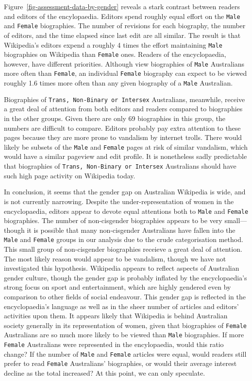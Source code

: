 \documentclass[
  a4paper,
  DIV=11,
  numbers=noendperiod]{scrreprt}
\begin{document}
Figure~\ref{fig-assessment-data-by-gender} reveals a stark contrast
between readers and editors of the encylopaedia. Editors spend roughly
equal effort on the \texttt{Male} and \texttt{Female} biographies. The
number of revisions for each biography, the number of editors, and the
time elapsed since last edit are all similar. The result is that
Wikipedia's editors expend a roughly 4 times the effort maintaining
\texttt{Male} biographies on Wikipedia than \texttt{Female} ones.
Readers of the encyclopaedia, however, have different priorities.
Although view biographies of \texttt{Male} Australians more often than
\texttt{Female}, an individual \texttt{Female} biography can expect to
be viewed roughly 1.6 times more often than any given biography of a
\texttt{Male} Australian.

Biographies of \texttt{Trans,\ Non-Binary\ or\ Intersex} Australians,
meanwhile, receive a great deal of attention from both editors and
readers compared to biographies in the other groups. Given there are
only 69 biographies in this group, the numbers are difficult to compare.
Editors probably pay extra attention to these pages because they are
more prone to vandalism by internet trolls. There would likely be
subsets of the \texttt{Male} and \texttt{Female} pages at risk of
similar vandalism, which would have a similar pageview and edit profile.
It is nonetheless sadly predictable that biographies of
\texttt{Trans,\ Non-Binary\ or\ Intersex} Australians should have such
high page activity on Wikipedia today.

In conclusion, it seems that the gender gap on Australian Wikipedia is
wide, and is not currently narrowing. Despite the under-representation
of women in the encyclopaedia, editors appear to devote equal attentions
both to \texttt{Male} and \texttt{Female} biographies. The number of
non-cisgender biographies appears to be very small---though it is
possible that many non-cisgender Australians have fallen into the
\texttt{Male} and \texttt{Female} groups in our analysis due to the
crude categorisation method. This small group of non-cisgender
biographies receieve a great deal of attention. The most likely reason
would appear to be vandalism, though we have not investigated this
hypothesis. Wikipedia appears to reflect aspects of Australian gender
culture, though the gender gap is probably inflated by the
encyclopaedia's strong focus on sport and entertainment, which are
highly gendered even by comparison to other fields of social endeavour.
This gender gap is reflected in the encyclopaedia's language as well as
in the sheer number of articles and editors' activities upon them. It
appears likely that Wikipedia is behind Australian society generally in
its representation of women, given that biographies of \texttt{Female}
Australians are so much more likely to be viewed than \texttt{Male}
biographies. If more \texttt{Female} Australians were represented in the
encylopaedia, would this ratio change? If the number of \texttt{Male}
and \texttt{Female} articles were equal, would readers still prefer to
read \texttt{Female} Australians' biographies, or would their average
interest decline as the total increased? At this point, we can only
speculate.
\end{document}

